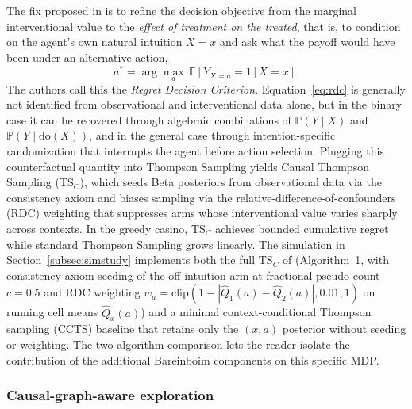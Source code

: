 The fix proposed in \citet{bareinboim2015mabuc} is to refine the decision objective from the marginal interventional value to the \emph{effect of treatment on the treated}, that is, to condition on the agent's own natural intuition $X = x$ and ask what the payoff would have been under an alternative action,
\begin{equation}
a^* = \arg\max_{a}\, \mathbb{E}\!\left[Y_{X = a} = 1 \,\big|\, X = x\right].
\label{eq:rdc}
\end{equation}
The authors call this the \emph{Regret Decision Criterion}. Equation~\eqref{eq:rdc} is generally not identified from observational and interventional data alone, but in the binary case it can be recovered through algebraic combinations of $\mathbb{P}(Y \mid X)$ and $\mathbb{P}(Y \mid \mathrm{do}(X))$, and in the general case through intention-specific randomization that interrupts the agent before action selection. Plugging this counterfactual quantity into Thompson Sampling yields Causal Thompson Sampling ($\text{TS}_C$), which seeds Beta posteriors from observational data via the consistency axiom and biases sampling via the relative-difference-of-confounders (RDC) weighting that suppresses arms whose interventional value varies sharply across contexts. In the greedy casino, $\text{TS}_C$ achieves bounded cumulative regret while standard Thompson Sampling grows linearly. The simulation in Section~\ref{subsec:simstudy} implements both the full $\text{TS}_C$ of \citet{bareinboim2015mabuc} (Algorithm~1, with consistency-axiom seeding of the off-intuition arm at fractional pseudo-count $c = 0.5$ and RDC weighting $w_a = \mathrm{clip}(1 - |\hat Q_1(a) - \hat Q_2(a)|, 0.01, 1)$ on running cell means $\hat Q_x(a)$) and a minimal context-conditional Thompson sampling (CCTS) baseline that retains only the $(x, a)$ posterior without seeding or weighting. The two-algorithm comparison lets the reader isolate the contribution of the additional Bareinboim components on this specific MDP.

\subsubsection*{Causal-graph-aware exploration}

